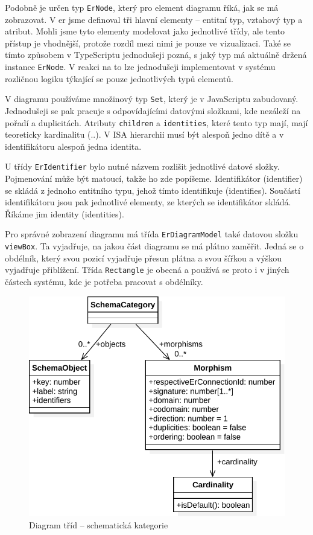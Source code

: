 Podobně je určen typ \texttt{ErNode}, který pro element diagramu říká, jak se má zobrazovat.
V \acrshort{er} jsme definoval tři hlavní elementy -- entitní typ, vztahový typ a atribut.
Mohli jsme tyto elementy modelovat jako jednotlivé třídy, ale tento přístup je vhodnější, protože rozdíl mezi nimi je pouze ve vizualizaci.
Také se tímto způsobem v TypeScriptu jednodušeji pozná, s jaký typ má aktuálně držená instance \texttt{ErNode}.
V reakci na to lze jednodušeji implementovat v systému rozličnou logiku týkající se pouze jednotlivých typů elementů.

V diagramu používáme množinový typ \texttt{Set}, který je v JavaScriptu zabudovaný.
Jednodušeji se pak pracuje s odpovídajícími datovými složkami, kde nezáleží na pořadí a duplicitách.
Atributy \texttt{children} a \texttt{identities}, které tento typ mají, mají teoreticky kardinalitu (\one{}..\many{}).
V ISA hierarchii musí být alespoň jedno dítě a v identifikátoru alespoň jedna identita.

U třídy \texttt{ErIdentifier} bylo nutné názvem rozlišit jednotlivé datové složky.
Pojmenování může být matoucí, takže ho zde popíšeme.
Identifikátor (identifier) se skládá z jednoho entitního typu, jehož tímto identifikuje (identifies).
Součástí identifikátoru jsou pak jednotlivé elementy, ze kterých se identifikátor skládá.
Říkáme jim identity (identities).

Pro správné zobrazení diagramu má třída \texttt{ErDiagramModel} také datovou složku \texttt{viewBox}.
Ta vyjadřuje, na jakou část diagramu se má plátno zaměřit.
Jedná se o obdélník, který svou pozicí vyjadřuje přesun plátna a svou šířkou a výškou vyjadřuje přiblížení.
Třída \texttt{Rectangle} je obecná a používá se proto i v jiných částech systému, kde je potřeba pracovat s obdélníky.


\begin{figure}[!htb]
  \centering
  \includegraphics[width=\maxwidth{\textwidth}]{../img/diagrams/schemcat-class-diagram.pdf}
  \caption{Diagram tříd -- schematická kategorie}
  \label{fig:schemcat-class-diagram}
\end{figure}

